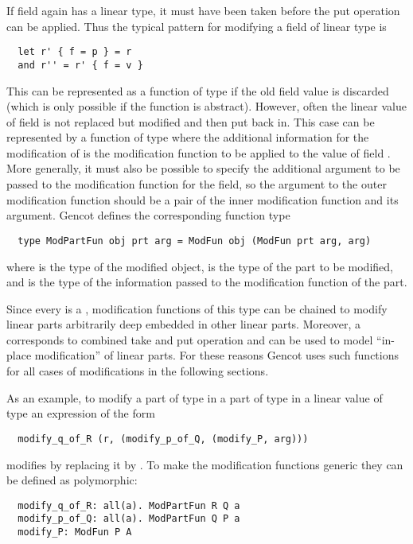 If field  again has a linear type, it must have been taken before the put operation can be applied. Thus the 
typical pattern for modifying a field of linear type is
\begin{verbatim}
  let r' { f = p } = r 
  and r'' = r' { f = v }
\end{verbatim}
This can be represented as a function of type  if the old field value is discarded (which is only possible
if the function is abstract). However, often the linear value of field  is not replaced but modified and then put back
in. This case can be represented by a function of type  where the additional information for the modification
of  is the modification function to be applied to the value of field . More generally, it must also be possible
to specify the additional argument to be passed to the modification function for the field, so the argument to the outer 
modification function should be a pair of the inner modification function and its argument. Gencot defines the corresponding
function type
\begin{verbatim}
  type ModPartFun obj prt arg = ModFun obj (ModFun prt arg, arg)
\end{verbatim}
where  is the type of the modified object,  is the type of the part to be modified, and  is the type
of the information passed to the modification function of the part.

Since every  is a , modification functions of this type can be chained to modify linear parts arbitrarily 
deep embedded in other linear parts. Moreover, a  corresponds to combined take and put operation and can be used
to model ``in-place modification'' of linear parts. For these reasons Gencot uses such functions for all cases of modifications 
in the following sections.

As an example, to modify a part  of type  in a part  of type  in a linear value  of type 
an expression of the form
\begin{verbatim}
  modify_q_of_R (r, (modify_p_of_Q, (modify_P, arg)))
\end{verbatim}
modifies  by replacing it by . To make the modification functions generic they can be defined as polymorphic:
\begin{verbatim}
  modify_q_of_R: all(a). ModPartFun R Q a
  modify_p_of_Q: all(a). ModPartFun Q P a
  modify_P: ModFun P A
\end{verbatim}

